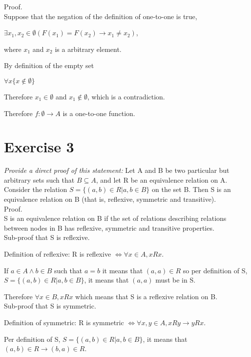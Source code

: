 \documentclass[a4paper,11pt]{article}
\begin{document}
\noindent Proof.\\

Suppose that the negation of the definition of one-to-one is true,

$
\exists x_1, x_2 \in \emptyset (F(x_1) = F(x_2) \to x_1 \neq x_2)
$,

where $x_1$ and $x_2$ is a arbitrary element.

By definition of the empty set

$\forall x \{ x \notin \emptyset \}$

Therefore $x_1 \in \emptyset$ and $x_1 \notin \emptyset$, which is a contradiction.

Therefore $f : \emptyset \to A$ is a one-to-one function.

\section*{Exercise 3}
\textit{Provide a direct proof of this statement:} Let A and B be two particular but arbitrary
sets such that $B \subseteq A$, and let R be an equivalence relation on A. Consider the relation
$S = \{(a,b) \in R | a,b \in B \}$ on the set B. Then S is an equivalence relation on B (that
is, reflexive, symmetric and transitive).\\


\noindent Proof.\\

\noindent S is an equivalence relation on B if the set of relations describing relations between nodes in B has reflexive, symmetric and transitive properties.\\

\noindent Sub-proof that S is reflexive.


Definition of reflexive: R is reflexive $\iff \forall x \in A, x R x$.

If $a \in A \land b \in B$ such that $a=b$ it means that $(a,a) \in R$ so per definition of S, $S = \{(a,b) \in R | a,b \in B \}$, it means that $(a,a)$ must be in S.

Therefore $\forall x \in B, x R x$ which means that S is a reflexive relation on B.\\

\noindent Sub-proof that S is symmetric.

Definition of symmetric: R is symmetric $\iff \forall x, y \in A, x R y \to y R x $.

Per definition of S, $S = \{(a,b) \in R | a,b \in B \}$, it means that $(a,b) \in R \to (b,a) \in R$.
\end{document}

